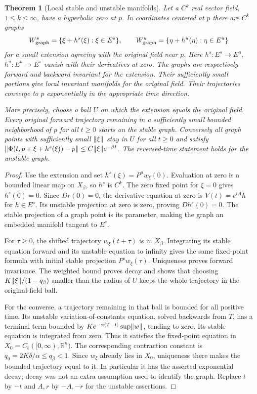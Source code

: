 \documentclass[11pt,oneside]{book}
\newtheorem{theorem}{Theorem}[chapter]
\theoremstyle{definition}
\theoremstyle{remark}\newtheorem{remark}[theorem]{Remark}
\newcommand{\R}{\mathbb R}\newcommand{\C}{\mathbb C}
\begin{document}
\begin{theorem}[Local stable and unstable manifolds]
\label{d13:20:stable-manifold}
Let a $C^k$ real vector field, $1\leq k\leq\infty$, have a hyperbolic zero
at $p$. In coordinates centered at $p$ there are $C^k$ graphs
\[
 W^s_{\rm graph}=\{\xi+h^s(\xi):\xi\in E^s\},\qquad
 W^u_{\rm graph}=\{\eta+h^u(\eta):\eta\in E^u\}
\]
for a small extension agreeing with the original field near $p$.
Here $h^s:E^s\to E^u$, $h^u:E^u\to E^s$ vanish with their derivatives at
zero. The graphs are respectively forward and backward invariant for the
extension. Their sufficiently small portions give local invariant
manifolds for the original field. Their trajectories converge to $p$
exponentially in the appropriate time direction.

More precisely, choose a ball $U$ on which the extension equals the
original field. Every original forward trajectory remaining in a
sufficiently small bounded neighborhood of $p$ for all $t\geq0$ starts
on the stable graph. Conversely all graph points with sufficiently small
$\lVert\xi\rVert$ stay in $U$ for all $t\geq0$ and satisfy
$\lVert\Phi(t,p+\xi+h^s(\xi))-p\rVert\leq C\lVert\xi\rVert e^{-\beta t}$.
The reversed-time statement holds for the unstable graph.
\end{theorem}
\begin{proof}
Use the extension and set $h^s(\xi)=P^u w_\xi(0)$. Evaluation at zero is a
bounded linear map on $X_\beta$, so $h^s$ is $C^k$. The zero fixed point
for $\xi=0$ gives $h^s(0)=0$. Since $Dr(0)=0$, the derivative equation at
zero is $V(t)=e^{tA}h$ for $h\in E^s$. Its unstable projection at zero is
zero, proving $Dh^s(0)=0$. The stable projection of a graph point is its
parameter, making the graph an embedded manifold tangent to $E^s$.

For $\tau\geq0$, the shifted trajectory $w_\xi(t+\tau)$ is in $X_\beta$.
Integrating its stable equation forward and its unstable equation to
infinity gives the same fixed-point formula with initial stable
projection $P^s w_\xi(\tau)$. Uniqueness proves forward invariance.
The weighted bound proves decay and shows that choosing
$K\lVert\xi\rVert/(1-q_\beta)$ smaller than the radius of $U$ keeps the whole
trajectory in the original-field ball.

For the converse, a trajectory remaining in that ball is bounded for all
positive time. Its unstable variation-of-constants equation, solved
backwards from $T$, has a terminal term bounded by
$Ke^{-\alpha(T-t)}\sup\lVert w\rVert$, tending to zero. Its stable equation is
integrated from zero. Thus it satisfies the fixed-point equation in
$X_0=C_b([0,\infty),\R^n)$. The corresponding contraction constant is
$q_0=2K\delta/\alpha\leq q_\beta<1$. Since $w_\xi$ already lies in $X_0$,
uniqueness there makes the bounded trajectory equal to it. In particular
it has the asserted exponential decay; decay was not an extra assumption
used to identify the graph. Replace $t$ by $-t$ and $A,r$ by $-A,-r$ for
the unstable assertions.
\end{proof}
\end{document}
